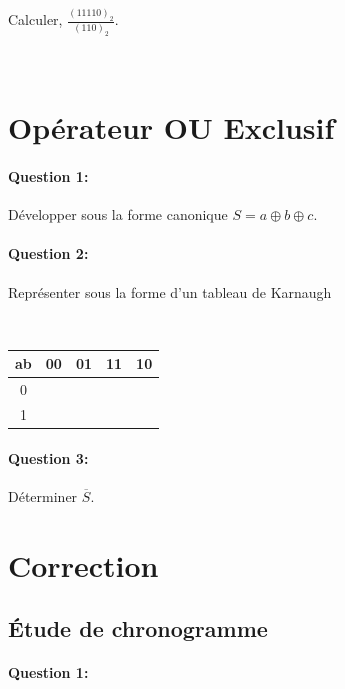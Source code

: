 Calculer, $\frac{(11110)_{2}}{(110)_{2}}$.

~\

\section{Opérateur OU Exclusif}

\paragraph{Question 1:}

Développer sous la forme canonique $S= a \oplus b \oplus c$.

\paragraph{Question 2:}

Représenter sous la forme d'un tableau de Karnaugh

~\

\begin{center}
\begin{tabular}{|c|c|c|c|c|}
\hline
ab & 00 & 01 & 11 & 10 \\
\hline
0  &    &    &    &    \\
\hline
1  &    &    &    & \\
\hline
\end{tabular} 
\end{center}

\paragraph{Question 3:}

Déterminer $\overline{S}$.

\clearpage

\ifdef{\public}{}{}

\newpage

\pagestyle{correction}

\section{Correction}

\subsection{Étude de chronogramme}

\paragraph{Question 1:}

